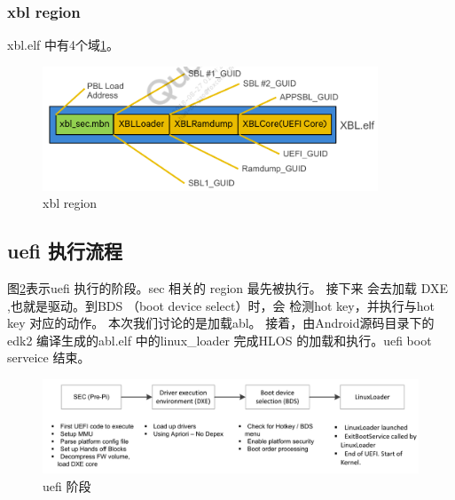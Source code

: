 \subsubsection{xbl region}
xbl.elf 中有4个域\ref{xblreg}。

\begin{figure}[htbp]
\begin{center}
\includegraphics[width=10cm]{img/xbl_reg}
\caption{xbl region}
\label{xblreg}
\end{center}
\vspace{-0.5em}
\end{figure}









\subsection{uefi 执行流程}


图\ref{xblstage}表示uefi 执行的阶段。sec 相关的 region 最先被执行。
接下来 会去加载 DXE ,也就是驱动。到BDS （boot device select）时，会
检测hot key，并执行与hot key 对应的动作。 本次我们讨论的是加载abl。
接着，由Android源码目录下的 edk2 编译生成的abl.elf 中的linux\_loader
完成HLOS 的加载和执行。uefi boot serveice 结束。

\begin{figure}[htbp]
\begin{center}
\includegraphics[width=15cm]{img/uefistage}
\caption{uefi 阶段}
\label{xblstage}
\end{center}
\vspace{-0.5em}
\end{figure}




